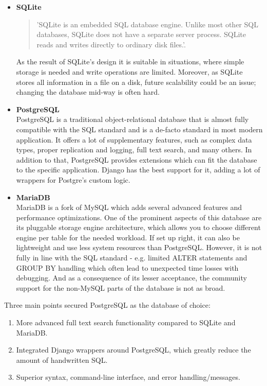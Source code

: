\begin{itemize}
    \item \textbf{SQLite} \\
    \begin{quote}
        'SQLite is an embedded SQL database engine.
        Unlike most other SQL databases, SQLite does not have a separate
        server process. SQLite reads and writes directly to ordinary disk
        files.'\cite{sqlite}.
    \end{quote}
    As the result of SQLite's design it is suitable
    in situations, where simple storage is needed and write operations are limited.
    Moreover, as SQLite stores all information in a file on a disk, future scalability could be an issue;
    changing the database mid-way is often hard.

    \item \textbf{PostgreSQL} \\
    PostgreSQL is a traditional object-relational database that is almost fully compatible with the SQL standard
    and is a de-facto standard in most modern application. It offers a lot of supplementary features,
    such as complex data types, proper replication and logging, full text search, and many others.
    In addition to that, PostgreSQL provides extensions which can fit the database to the specific application.
    \cite{postgres}
    Django has the best support for it, adding a lot of wrappers for Postgre's custom logic.\cite{django_postgres}

    \item \textbf{MariaDB} \\
    MariaDB is a fork of MySQL which adds several advanced features and performance optimizations.
    One of the prominent aspects of this database are its pluggable storage engine architecture,
    which allows you to choose different engine per table for the needed workload.\cite{mariadb}
    If set up right, it can also be lightweight and use less system resources than PostgreSQL.
    However, it is not fully in line with the SQL standard -
    e.g. limited ALTER statements and GROUP BY handling\cite{dbfunctions} which often lead to unexpected time losses
    with debugging.
    And as a consequence of its lesser acceptance\cite{dbrank},
    the community support for the non-MySQL parts of the database is not as broad.
\end{itemize}
Three main points secured PostgreSQL as the database of choice:
\begin{enumerate}
    \item More advanced full text search functionality compared to SQLite and MariaDB.
    \item Integrated Django wrappers around PostgreSQL, which greatly reduce the amount of handwritten SQL.
    \item Superior syntax, command-line interface, and error handling/messages.
\end{enumerate}


